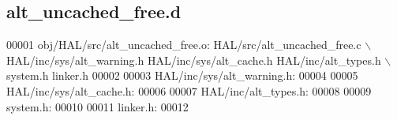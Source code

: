 \subsection{alt\+\_\+uncached\+\_\+free.\+d}
\label{alt__uncached__free_8d_source}

\begin{DoxyCode}
00001 obj/HAL/src/alt_uncached_free.o: HAL/src/alt_uncached_free.c \(\backslash\)
 HAL/inc/sys/alt\_warning.h HAL/inc/sys/alt\_cache.h HAL/inc/alt\_types.h \(\backslash\)
 system.h linker.h
00002 
00003 HAL/inc/sys/alt\_warning.h:
00004 
00005 HAL/inc/sys/alt\_cache.h:
00006 
00007 HAL/inc/alt\_types.h:
00008 
00009 system.h:
00010 
00011 linker.h:
00012 \end{DoxyCode}
